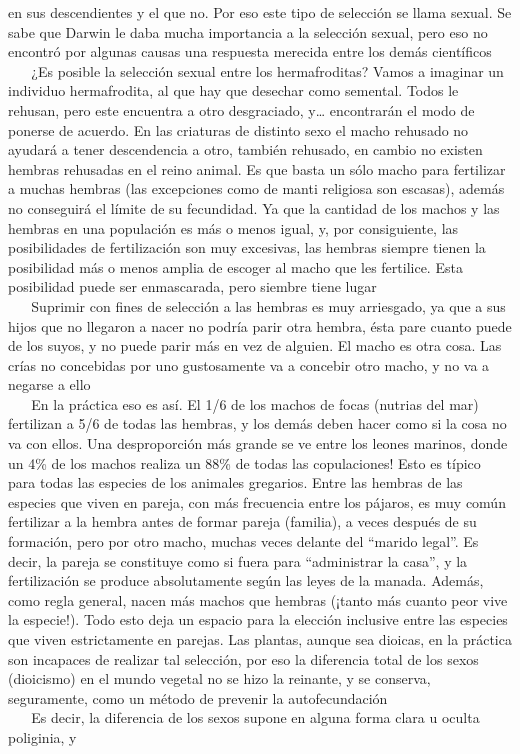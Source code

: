 en sus descendientes y el que no. Por eso este tipo de selección se
llama sexual. Se sabe que Darwin le daba mucha importancia a la
selección sexual, pero eso no encontró por algunas causas una respuesta
merecida entre los demás científicos\\
\hspace*{0.333em} ~ ~ ¿Es posible la selección sexual entre los
hermafroditas? Vamos a imaginar un individuo hermafrodita, al que hay
que desechar como semental. Todos le rehusan, pero este encuentra a otro
desgraciado, y\ldots{} encontrarán el modo de ponerse de acuerdo. En las
criaturas de distinto sexo el macho rehusado no ayudará a tener
descendencia a otro, también rehusado, en cambio no existen hembras
rehusadas en el reino animal. Es que basta un sólo macho para fertilizar
a muchas hembras (las excepciones como de manti religiosa son escasas),
además no conseguirá el límite de su fecundidad. Ya que la cantidad de
los machos y las hembras en una populación es más o menos igual, y, por
consiguiente, las posibilidades de fertilización son muy excesivas, las
hembras siempre tienen la posibilidad más o menos amplia de escoger al
macho que les fertilice. Esta posibilidad puede ser enmascarada, pero
siembre tiene lugar\\
\hspace*{0.333em} ~ ~ Suprimir con fines de selección a las hembras es
muy arriesgado, ya que a sus hijos que no llegaron a nacer no podría
parir otra hembra, ésta pare cuanto puede de los suyos, y no puede parir
más en vez de alguien. El macho es otra cosa. Las crías no concebidas
por uno gustosamente va a concebir otro macho, y no va a negarse a
ello\\
\hspace*{0.333em} ~ ~ En la práctica eso es así. El 1/6 de los machos de
focas (nutrias del mar) fertilizan a 5/6 de todas las hembras, y los
demás deben hacer como si la cosa no va con ellos. Una desproporción más
grande se ve entre los leones marinos, donde un 4\% de los machos
realiza un 88\% de todas las copulaciones! Esto es típico para todas las
especies de los animales gregarios. Entre las hembras de las especies
que viven en pareja, con más frecuencia entre los pájaros, es muy común
fertilizar a la hembra antes de formar pareja (familia), a veces después
de su formación, pero por otro macho, muchas veces delante del ``marido
legal''. Es decir, la pareja se constituye como si fuera para
``administrar la casa'', y la fertilización se produce absolutamente
según las leyes de la manada. Además, como regla general, nacen más
machos que hembras (¡tanto más cuanto peor vive la especie!). Todo esto
deja un espacio para la elección inclusive entre las especies que viven
estrictamente en parejas. Las plantas, aunque sea dioicas, en la
práctica son incapaces de realizar tal selección, por eso la diferencia
total de los sexos (dioicismo) en el mundo vegetal no se hizo la
reinante, y se conserva, seguramente, como un método de prevenir la
autofecundación\\
\hspace*{0.333em} ~ ~ Es decir, la diferencia de los sexos supone en
alguna forma clara u oculta poliginia, y

